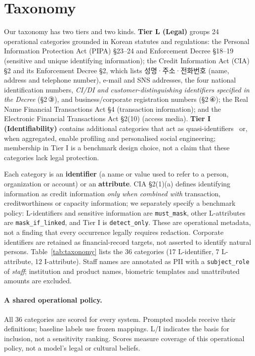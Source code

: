\section{Taxonomy}
\label{sec:taxonomy}

Our taxonomy has two tiers and two kinds. \textbf{Tier L (Legal)} groups 24 operational categories grounded in Korean statutes and regulations: the Personal Information Protection Act (PIPA) \S23--24 and Enforcement Decree \S18--19 (sensitive and unique identifying information); the Credit Information Act (CIA) \S2 and its Enforcement Decree \S2, which lists 성명·주소·전화번호 (name, address and telephone number), e-mail and SNS addresses, the four national identification numbers, \emph{CI/DI and customer-distinguishing identifiers specified in the Decree} (\S2\,③), and business/corporate registration numbers (\S2\,④); the Real Name Financial Transactions Act \S4 (transaction information); and the Electronic Financial Transactions Act \S2(10) (access media). \textbf{Tier I (Identifiability)} contains additional categories that act as quasi-identifiers~\cite{pilan2022tab} or, when aggregated, enable profiling and personalised social engineering; membership in Tier I is a benchmark design choice, not a claim that these categories lack legal protection.

Each category is an \textbf{identifier} (a name or value used to refer to a person, organization or account) or an \textbf{attribute}. CIA \S2(1)(a) defines identifying information as credit information \emph{only when combined with} transaction, creditworthiness or capacity information; we separately specify a benchmark policy: L-identifiers and sensitive information are \nolinkurl{must_mask}, other L-attributes are \nolinkurl{mask_if_linked}, and Tier I is \nolinkurl{detect_only}. These are operational metadata, not a finding that every occurrence legally requires redaction. Corporate identifiers are retained as financial-record targets, not asserted to identify natural persons. Table~\ref{tab:taxonomy} lists the 36 categories (17 L-identifier, 7 L-attribute, 12 I-attribute). Staff names are annotated as PII with a \nolinkurl{subject_role} of \emph{staff}; institution and product names, biometric templates and unattributed amounts are excluded.

\paragraph{A shared operational policy.}
All 36 categories are scored for every system. Prompted models receive their definitions; baseline labels use frozen mappings. L/I indicates the basis for inclusion, not a sensitivity ranking. Scores measure coverage of this operational policy, not a model's legal or cultural beliefs.

